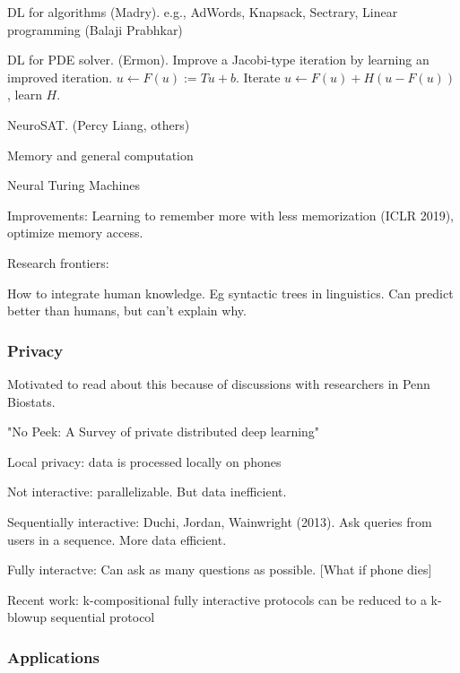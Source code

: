 \documentclass[english]{article}
\begin{document}
DL for algorithms (Madry). e.g., AdWords, Knapsack, Sectrary, Linear programming (Balaji Prabhkar)

DL for PDE solver. (Ermon). Improve a Jacobi-type iteration by learning an improved iteration. $u\gets  F(u):=Tu+b$. Iterate $u\gets  F(u) + H(u-F(u))$, learn $H$.

NeuroSAT. (Percy Liang, others)

\item Memory and general computation

Neural Turing Machines

Improvements: Learning to remember more with less memorization (ICLR 2019), optimize memory access.


\item Research frontiers: 

How to integrate human knowledge. Eg syntactic trees in linguistics. Can predict better than humans, but can't explain why. 

\eenum 


\subsubsection{Privacy}


\benum 
\item Motivated to read about this because of discussions with researchers in Penn Biostats.

\item "No Peek: A Survey of private distributed deep
learning"

\item Local privacy: data is processed locally on phones

Not interactive:  parallelizable. But data inefficient.

Sequentially interactive: Duchi, Jordan, Wainwright (2013). Ask queries from users in a sequence. More data efficient.

Fully interactve: Can ask as many questions as possible. [What if phone dies]

Recent work: k-compositional fully interactive protocols can be reduced to a k-blowup sequential protocol


\eenum







\subsubsection{Applications}
\end{document}
